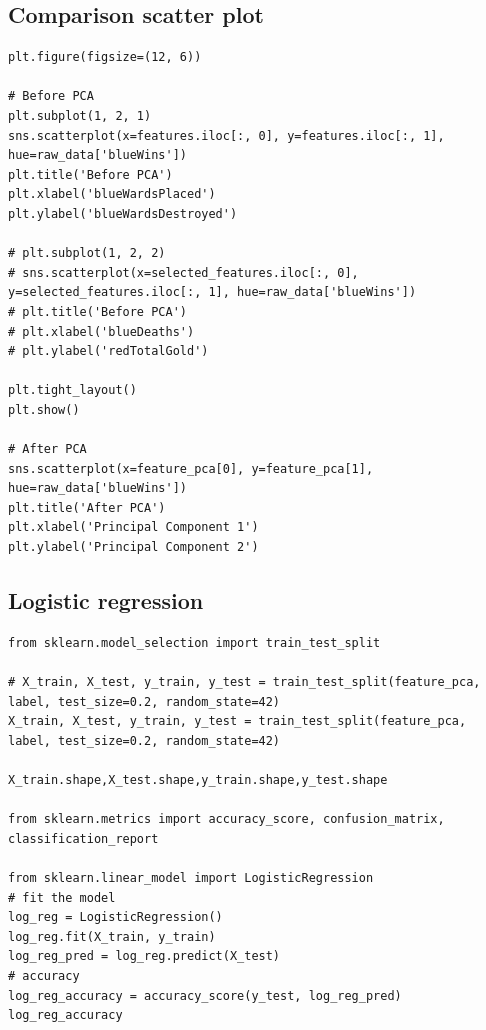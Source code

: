 \documentclass[stu,12pt,floatsintext]{apa7}
\begin{document}
\subsection{Comparison scatter plot}
\begin{lstlisting}[style=pythonstyle]
plt.figure(figsize=(12, 6))

# Before PCA
plt.subplot(1, 2, 1)
sns.scatterplot(x=features.iloc[:, 0], y=features.iloc[:, 1], hue=raw_data['blueWins'])
plt.title('Before PCA')
plt.xlabel('blueWardsPlaced')
plt.ylabel('blueWardsDestroyed')

# plt.subplot(1, 2, 2)
# sns.scatterplot(x=selected_features.iloc[:, 0], y=selected_features.iloc[:, 1], hue=raw_data['blueWins'])
# plt.title('Before PCA')
# plt.xlabel('blueDeaths')
# plt.ylabel('redTotalGold')

plt.tight_layout()
plt.show()

# After PCA
sns.scatterplot(x=feature_pca[0], y=feature_pca[1], hue=raw_data['blueWins'])
plt.title('After PCA')
plt.xlabel('Principal Component 1')
plt.ylabel('Principal Component 2')

\end{lstlisting}

\subsection{Logistic regression}
\begin{lstlisting}[style=pythonstyle]
from sklearn.model_selection import train_test_split

# X_train, X_test, y_train, y_test = train_test_split(feature_pca, label, test_size=0.2, random_state=42)
X_train, X_test, y_train, y_test = train_test_split(feature_pca, label, test_size=0.2, random_state=42)

X_train.shape,X_test.shape,y_train.shape,y_test.shape

from sklearn.metrics import accuracy_score, confusion_matrix, classification_report

from sklearn.linear_model import LogisticRegression
# fit the model
log_reg = LogisticRegression()
log_reg.fit(X_train, y_train)
log_reg_pred = log_reg.predict(X_test)
# accuracy
log_reg_accuracy = accuracy_score(y_test, log_reg_pred)
log_reg_accuracy
\end{lstlisting}
\end{document}
